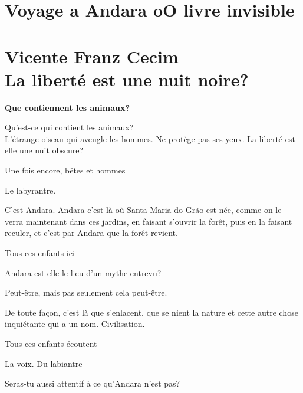 \part*{Voyage a Andara oO livre invisible\\
\bigskip
\bigskip
\bigskip
\bigskip
{}\\
\Large{Vicente Franz Cecim}\\
\bigskip
\bigskip
\normalsize{La liberté est une nuit noire?}}




\forceindent{}\textbf{Que contiennent les animaux?}

Qu'est-ce qui contient les animaux?\\

L'étrange oiseau qui aveugle les hommes. Ne protège pas ses yeux. La
liberté est-elle une nuit obscure?

Une fois encore, bêtes et hommes

\breakk

\vspace*{4cm}

Le labyrantre.

C'est Andara. Andara c'est là où Santa Maria do Grão est née, comme on
le verra maintenant dans ces jardins, en faisant s'ouvrir la forêt, puis
en la faisant reculer, et c'est par Andara que la forêt revient.

Tous ces enfants ici

Andara est-elle le lieu d'un mythe entrevu?

Peut-être, mais pas seulement cela peut-être.

De toute façon, c'est là que s'enlacent, que se nient la nature et cette
autre chose inquiétante qui a un nom. Civilisation.

Tous ces enfants écoutent

La voix. Du labiantre

\breakk

\vspace*{4cm}

Seras-tu aussi attentif à ce qu'Andara n'est pas?

